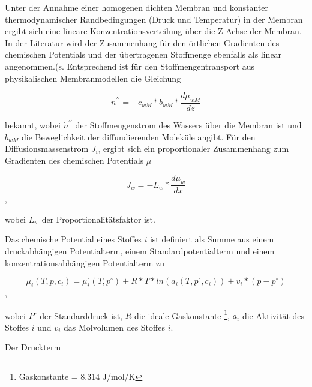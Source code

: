 \begin{normalsize}

Unter der Annahme einer homogenen dichten Membran und konstanter thermodynamischer Randbedingungen (Druck und Temperatur) in der Membran ergibt sich eine lineare Konzentrationsverteilung über die Z-Achse der Membran. In der Literatur wird der Zusammenhang für den örtlichen Gradienten des chemischen Potentials und der übertragenen Stoffmenge ebenfalls als linear angenommen.(s.\cite{Koester.2015} 
Entsprechend ist für den Stoffmengentransport aus physikalischen Membranmodellen die Gleichung 

\begin{equation}
 \dot{n}^{\prime\prime} = - c_{wM} * b_{wM} * \frac{d\mu_{wM}}{dz}
\end{equation}

bekannt, wobei $\dot{n}^{\prime\prime}$ der Stoffmengenstrom des Wassers über die Membran ist und $b_{wM}$ die Beweglichkeit der diffundierenden Moleküle angibt. \cite{T.Melin.2007}
Für den Diffusionsmassenstrom $J_{w}$ ergibt sich ein proportionaler Zusammenhang zum Gradienten des chemischen Potentials $\mu$

\begin{equation}
J_{w} = -L_{w}*\frac{d\mu_{w}}{dx}
\end{equation},

wobei $L_{w}$ der Proportionalitätsfaktor ist.

Das chemische Potential eines Stoffes $i$ ist definiert als Summe aus einem druckabhängigen Potentialterm, einem Standardpotentialterm und einem konzentrationsabhängigen Potentialterm zu

\begin{equation}
\mu_{i}(T,p,c_{i}) = \mu_{i}^\circ (T,p^\circ) + R*T*ln(a_{i}(T,p^\circ,c_{i})) + v_{i}*(p-p^\circ)
\end{equation},


wobei $P^\circ$ der Standarddruck ist, $R$ die ideale Gaskonstante \footnote{Gaskonstante = 8.314 J/mol/K}, $a_{i}$ die Aktivität des Stoffes $i$ und $v_{i}$ das Molvolumen des Stoffes $i$.


Der Druckterm


\end{normalsize}
